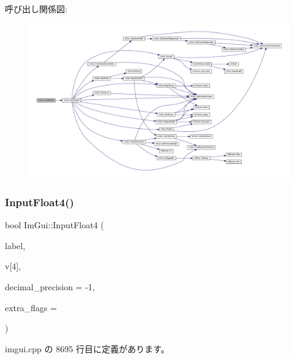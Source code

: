 呼び出し関係図\+:\nopagebreak
\begin{figure}[H]
\begin{center}
\leavevmode
\includegraphics[width=350pt]{namespace_im_gui_a77e8d23f2e0477d11a7eb6b0aa773eb9_cgraph}
\end{center}
\end{figure}
\mbox{\label{namespace_im_gui_a2c9bbb9a99bd8fee134a196fd1ec3dfb}} 
\subsubsection{\texorpdfstring{Input\+Float4()}{InputFloat4()}}
{\footnotesize\ttfamily bool Im\+Gui\+::\+Input\+Float4 (\begin{DoxyParamCaption}\item[{const char $\ast$}]{label,  }\item[{float}]{v\mbox{[}4\mbox{]},  }\item[{int}]{decimal\+\_\+precision = {\ttfamily -\/1},  }\item[{\mbox{\hyperlink{imgui_8h_a7d2c6153a6b9b5d3178ce82434ac9fb8}{Im\+Gui\+Input\+Text\+Flags}}}]{extra\+\_\+flags = {} }\end{DoxyParamCaption})}



 imgui.\+cpp の 8695 行目に定義があります。


